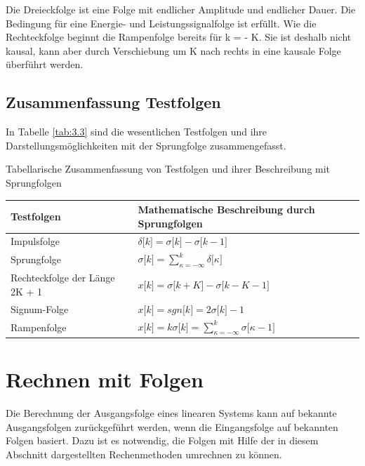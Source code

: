 Die Dreieckfolge ist eine Folge mit endlicher Amplitude und endlicher Dauer. Die Bedingung für eine Energie- und Leistungssignalfolge ist erfüllt. Wie die Rechteckfolge beginnt die Rampenfolge bereits für k = - K. Sie ist deshalb nicht kausal, kann aber durch Verschiebung um K nach rechts in eine kausale Folge überführt werden.

\subsection{Zusammenfassung Testfolgen}\label{sec:zusammenfassung-testfolgen}

In Tabelle \ref{tab:3.3} sind die wesentlichen Testfolgen und ihre Darstellungsmöglichkeiten mit der Sprungfolge zusammengefasst.

\begin{summary}{Tabellarische Zusammenfassung von Testfolgen und ihrer Beschreibung mit Sprungfolgen}
\label{tab:3.3}
\begin{center}
  \begin{tabular}{ll}
    \toprule
    Testfolgen & 
Mathematische Beschreibung 
durch Sprungfolgen \\
    \midrule
    Impulsfolge & \(\delta\lbrack k\rbrack = \sigma\lbrack k\rbrack - \sigma\lbrack k - 1\rbrack\) \\
    Sprungfolge & \(\sigma\lbrack k\rbrack = \sum\limits_{\kappa = - \infty}^{k}{\delta\lbrack\kappa\rbrack}\) \\
    Rechteckfolge der Länge 2K + 1 & \(x\lbrack k\rbrack = \sigma\lbrack k + K\rbrack - \sigma\lbrack k - K - 1\rbrack\) \\
    Signum-Folge & \(x\lbrack k\rbrack = {sgn}\lbrack k\rbrack = 2  \sigma\lbrack k\rbrack - 1\) \\
    Rampenfolge & \(x\lbrack k\rbrack = k  \sigma\lbrack k\rbrack = \sum\limits_{\kappa = - \infty}^{k}{\sigma\lbrack\kappa - 1\rbrack}\) \\
    \bottomrule
  \end{tabular}
\end{center}
\end{summary}

\section{Rechnen mit Folgen}\label{sec:3.3}

Die Berechnung der Ausgangsfolge eines linearen Systems kann auf bekannte Ausgangsfolgen zurückgeführt werden, wenn die Eingangsfolge auf bekannten Folgen basiert. Dazu ist es notwendig, die Folgen mit Hilfe der in diesem Abschnitt dargestellten Rechenmethoden umrechnen zu können.

